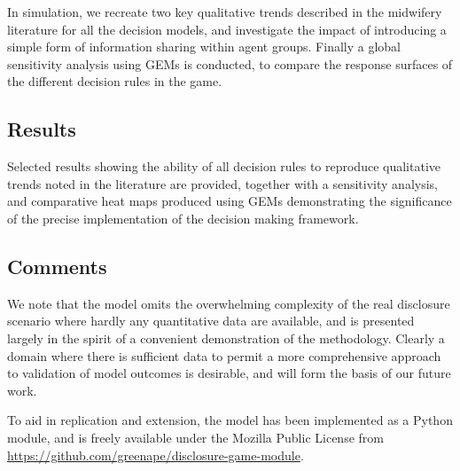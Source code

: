 In simulation, we recreate two key qualitative trends described in the midwifery literature for all the decision models, and investigate the impact of introducing a simple form of information sharing within agent groups.
Finally a global sensitivity analysis using \acp{GEM} is conducted, to compare the response surfaces of the different decision rules in the game.

\subsection*{Results} 

Selected results showing the ability of all decision rules to reproduce qualitative trends noted in the literature are provided, together with a sensitivity analysis, and comparative heat maps produced using \acp{GEM} demonstrating the significance of the precise implementation of the decision making framework.

\subsection*{Comments} 


We note that the model omits the overwhelming complexity of the real disclosure scenario where hardly any quantitative data are available, and is presented largely in the spirit of a convenient demonstration of the methodology. Clearly a domain where there is sufficient data to permit a more comprehensive approach to validation of model outcomes is desirable, and will form the basis of our future work.

To aid in replication and extension, the model has been implemented as a Python module, and is freely available under the Mozilla Public License from \url{https://github.com/greenape/disclosure-game-module}.

\glsresetall